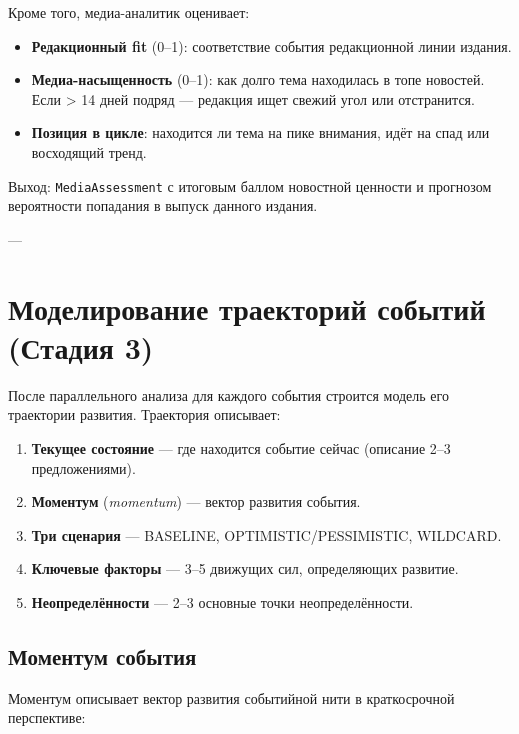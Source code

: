 Кроме того, медиа-аналитик оценивает:
\begin{itemize}
    \item \textbf{Редакционный fit} (0–1): соответствие события редакционной линии издания.
    \item \textbf{Медиа-насыщенность} (0–1): как долго тема находилась в топе новостей. Если > 14 дней подряд — редакция ищет свежий угол или отстранится.
    \item \textbf{Позиция в цикле}: находится ли тема на пике внимания, идёт на спад или восходящий тренд.
\end{itemize}

Выход: \texttt{MediaAssessment} с итоговым баллом новостной ценности и прогнозом вероятности попадания в выпуск данного издания.

---


\section{Моделирование траекторий событий (Стадия 3)}


После параллельного анализа для каждого события строится модель его траектории развития. Траектория описывает:

\begin{enumerate}
    \item \textbf{Текущее состояние} — где находится событие сейчас (описание 2–3 предложениями).
    \item \textbf{Моментум} (\emph{momentum}) — вектор развития события.
    \item \textbf{Три сценария} — BASELINE, OPTIMISTIC/PESSIMISTIC, WILDCARD.
    \item \textbf{Ключевые факторы} — 3–5 движущих сил, определяющих развитие.
    \item \textbf{Неопределённости} — 2–3 основные точки неопределённости.
\end{enumerate}

\subsection{Моментум события}

Моментум описывает вектор развития событийной нити в краткосрочной перспективе:

